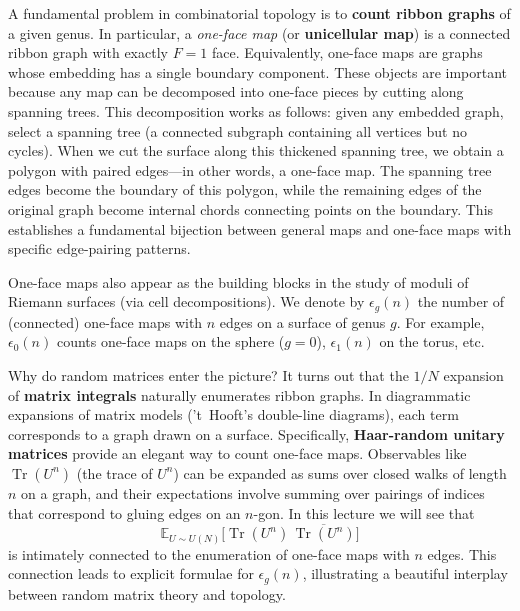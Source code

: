 \documentclass[letterpaper,11pt,oneside,reqno]{article}
\numberwithin{equation}{section}
\theoremstyle{definition}
\begin{document}
A fundamental problem in combinatorial topology is to \textbf{count ribbon graphs} of a given genus. In particular, a \emph{one-face map} (or \textbf{unicellular map}) is a connected ribbon graph with exactly $F=1$ face. Equivalently, one-face maps are graphs whose embedding has a single boundary component. These objects are important because any map can be decomposed into one-face pieces by cutting along spanning trees. This decomposition works as follows: given any embedded graph, select a spanning tree (a connected subgraph containing all vertices but no cycles). When we cut the surface along this thickened spanning tree, we obtain a polygon with paired edges—in other words, a one-face map. The spanning tree edges become the boundary of this polygon, while the remaining edges of the original graph become internal chords connecting points on the boundary. This establishes a fundamental bijection between general maps and one-face maps with specific edge-pairing patterns.

One-face maps also appear as the building blocks in the study of moduli of Riemann surfaces (via cell decompositions). We denote by $\epsilon_g(n)$ the number of (connected) one-face maps with $n$ edges on a surface of genus $g$. For example, $\epsilon_0(n)$ counts one-face maps on the sphere ($g=0$), $\epsilon_1(n)$ on the torus, etc.

Why do random matrices enter the picture?  It turns out that the $1/N$ expansion of \textbf{matrix integrals} naturally enumerates ribbon graphs. In diagrammatic expansions of matrix models ('t~Hooft's double-line diagrams), each term corresponds to a graph drawn on a surface. Specifically, \textbf{Haar-random unitary matrices} provide an elegant way to count one-face maps. Observables like $\operatorname{Tr}(U^n)$ (the trace of $U^n$) can be expanded as sums over closed walks of length $n$ on a graph, and their expectations involve summing over pairings of indices that correspond to gluing edges on an $n$-gon. In this lecture we will see that
\[ \mathbb{E}_{U\sim U(N)}\!\Big[\operatorname{Tr}(U^n)\,\overline{\operatorname{Tr}(U^n)}\Big] \]
is intimately connected to the enumeration of one-face maps with $n$ edges. This connection leads to explicit formulae for $\epsilon_g(n)$, illustrating a beautiful interplay between random matrix theory and topology.
\end{document}
